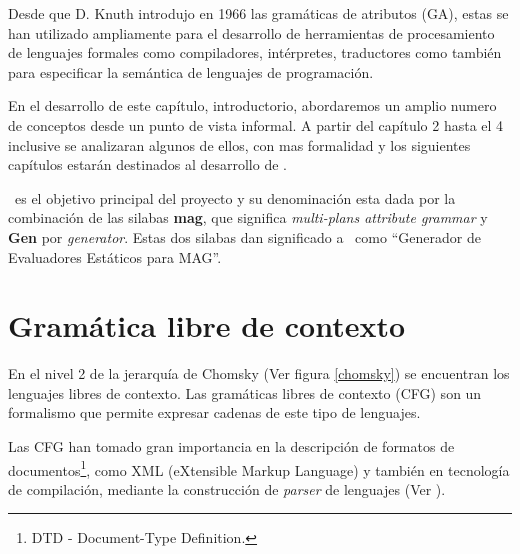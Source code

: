 Desde que D. Knuth introdujo en 1966 las gramáticas de atributos (GA), estas se han utilizado ampliamente para el desarrollo de herramientas de procesamiento de lenguajes formales como compiladores, intérpretes, traductores como también para especificar la semántica de lenguajes de programación.

En el desarrollo de este capítulo, introductorio, abordaremos un amplio numero de conceptos desde un punto de vista informal. A partir del capítulo 2 hasta el 4 inclusive se analizaran algunos de ellos, con mas formalidad y los siguientes capítulos estarán destinados al desarrollo de \maggen. 

\maggen\ es el objetivo principal del proyecto y su denominación esta dada por la combinación de las silabas \textbf{mag}, que significa \textit{multi-plans attribute grammar} y \textbf{Gen} por \textit{generator}. Estas dos silabas dan significado a \maggen\ como ``Generador de Evaluadores Estáticos para MAG''.

\section{Gramática libre de contexto}
\label{sec:def-CFG}
En el nivel 2 de la jerarquía de Chomsky (Ver figura \ref{chomsky}) se encuentran los lenguajes libres de contexto. Las gramáticas libres de contexto (CFG) son un formalismo que permite expresar cadenas de este tipo de lenguajes.

Las CFG han tomado gran importancia en la descripción de formatos de documentos\footnote{DTD - Document-Type Definition.}, como XML (eXtensible Markup Language) y también en tecnología de compilación, mediante la construcción de \textit{parser} de lenguajes (Ver \cite{compiladores}).  

